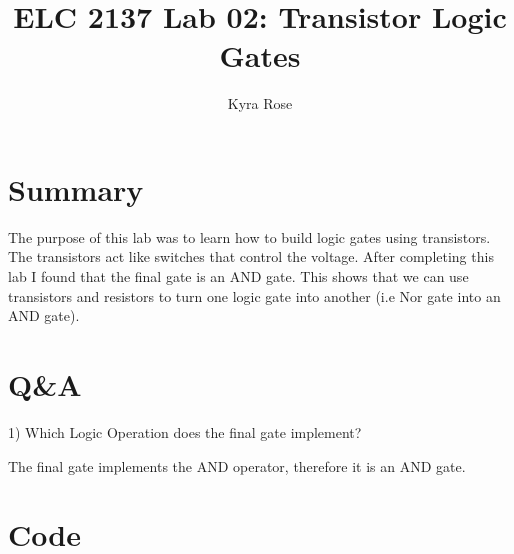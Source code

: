 \documentclass[11pt]{article}
\begin{document}
\title{ELC 2137 Lab 02: Transistor Logic Gates}
\author{Kyra Rose}

\maketitle


\section*{Summary}

  The purpose of this lab was to learn how to build logic gates using transistors. The transistors act like switches that control the voltage. After completing this lab I found that the final gate is an AND gate. This shows that we can use transistors and resistors to turn one logic gate into another (i.e Nor gate into an AND gate). 


\section*{Q\&A}

1) Which Logic Operation does the final gate implement?

The final gate implements the AND operator, therefore it is an AND gate. 

\section*{Code}
\end{document}
